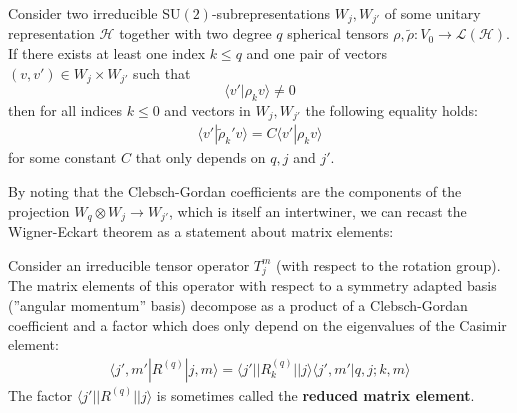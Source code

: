 	\begin{theorem}
		Consider two irreducible SU$(2)$-subrepresentations $W_j, W_{j'}$ of some unitary representation $\mathcal{H}$ together with two degree $q$ spherical tensors $\rho, \tilde{\rho}:V_0\rightarrow\mathcal{L}(\mathcal{H})$. If there exists at least one index $k\leq q$ and one pair of vectors $(v, v')\in W_j\times W_{j'}$ such that \[\langle v'|\rho_k v\rangle\neq 0\] then for all indices $k\leq 0$ and vectors in $W_j, W_{j'}$ the following equality holds:
		\begin{gather}
			\langle v'|\tilde{\rho}_k' v\rangle = C\langle v'|\rho_k v\rangle
		\end{gather}
		for some constant $C$ that only depends on $q, j$ and $j'$.
	\end{theorem}
	By noting that the Clebsch-Gordan coefficients are the components of the projection $W_q\otimes W_j\rightarrow W_{j'}$, which is itself an intertwiner, we can recast the Wigner-Eckart theorem as a statement about matrix elements:
	\begin{result}
		Consider an irreducible tensor operator $T_j^m$ (with respect to the rotation group). The matrix elements of this operator with respect to a symmetry adapted basis (''angular momentum'' basis) decompose as a product of a Clebsch-Gordan coefficient and a factor which does only depend on the eigenvalues of the Casimir element:
		\begin{gather}
			\langle j', m'|R^{(q)}|j, m\rangle = \langle j'||R_k^{(q)}||j\rangle\langle j', m'|q,j;k,m\rangle
		\end{gather}
		The factor $\langle j'||R^{(q)}||j\rangle$ is sometimes called the \textbf{reduced matrix element}.
	\end{result}